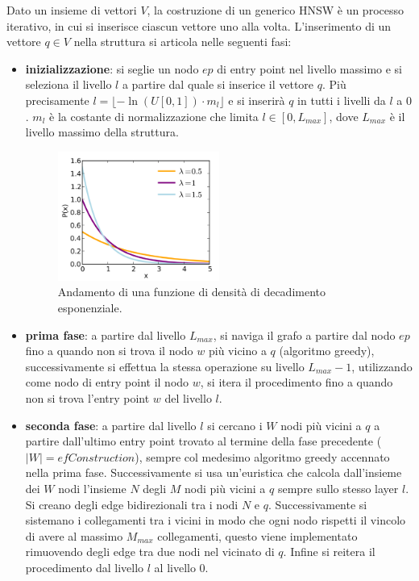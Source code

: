 Dato un insieme di vettori $V$, la costruzione di un generico HNSW  è un processo 
iterativo, in cui si inserisce ciascun vettore uno alla volta. L'inserimento di 
un vettore $q\in V$ nella struttura si articola nelle seguenti fasi:
\begin{itemize}
    \item \textbf{inizializzazione}: si seglie un nodo $ep$ di entry point nel livello massimo
    e si seleziona il livello $l$ a partire dal quale si inserice il vettore $q$.
    Più precisamente $l = \lfloor-\ln (U[0,1])\cdot m_l\rfloor$  e si inserirà $q$ 
    in tutti i livelli da $l$ a $0$. $m_l$ è la costante di normalizzazione che 
    limita $l\in [0, L_{max}]$, dove $L_{max}$ è il livello massimo della struttura.
    \begin{figure}
        \centering
        \includegraphics*[width=0.5\textwidth]{img/exp_decay_distr.png}
        \caption{Andamento di una funzione di densità di decadimento esponenziale. 
        \cite{exp_decay}}
        \label{fig:exp_decay}
    \end{figure}
    \item \textbf{prima fase}: a partire dal livello $L_{max}$, si naviga il grafo 
    a partire dal nodo $ep$ fino a quando non si trova il nodo $w$ più vicino a
    $q$ (algoritmo greedy), successivamente si effettua la stessa operazione 
    su livello $L_{max} - 1$, utilizzando come nodo di entry point il nodo $w$,
    si itera il procedimento fino a quando non si trova l'entry point $w$ del livello $l$.
    \item \textbf{seconda fase}: a partire dal livello $l$ si cercano i $W$ nodi 
    più vicini a $q$ a partire dall'ultimo entry point trovato al termine della fase precedente ($|W| = efConstruction$),
    sempre col medesimo algoritmo greedy accennato nella prima fase.
    Successivamente si usa un'euristica che calcola dall'insieme dei $W$ nodi
    l'insieme $N$ degli $M$ nodi più vicini a $q$ sempre sullo stesso layer $l$. 
    Si creano degli edge bidirezionali tra i nodi $N$ e $q$. Successivamente si 
    sistemano i collegamenti tra i vicini in modo che ogni nodo rispetti il vincolo 
    di avere al massimo $M_{max}$ collegamenti, questo viene implementato rimuovendo 
    degli edge tra due nodi nel vicinato di $q$. Infine si reitera il procedimento 
    dal livello $l$ al livello $0$.
\end{itemize}

